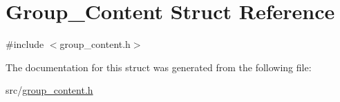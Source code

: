 \hypertarget{structGroup__Content}{
\section{Group\_\-Content Struct Reference}
\label{d2/d04/structGroup__Content}
}


{\ttfamily \#include $<$group\_\-content.h$>$}



The documentation for this struct was generated from the following file:\begin{DoxyCompactItemize}
\item 
src/\hyperlink{group__content_8h}{group\_\-content.h}\end{DoxyCompactItemize}
